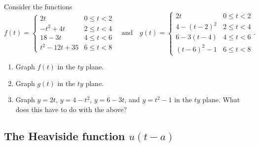 \begin{problem}
Consider the functions 
$$
f(t) = 
\begin{cases}
 2t & 0\leq t< 2\\
 -t^2+4t & 2\leq t< 4\\
 18-3t& 4\leq t< 6\\
 t^2-12t+35& 6\leq t< 8
\end{cases}
\quad\text{and}
\quad
g(t) = 
\begin{cases}
 2t & 0\leq t< 2\\
 4-(t-2)^2 & 2\leq t< 4\\
 6-3(t-4)& 4\leq t< 6\\
 (t-6)^2-1& 6\leq t< 8
\end{cases}.
$$
\begin{enumerate}
 \item Graph $f(t)$ in the $ty$ plane. 
 \item Graph $g(t)$ in the $ty$ plane. 
 \item Graph $y=2t$, $y=4-t^2$, $y=6-3t$, and $y=t^2-1$ in the $ty$ plane.  What does this have to do with the above?
\end{enumerate}

\end{problem}

\subsection{The Heaviside function $u(t-a)$}

